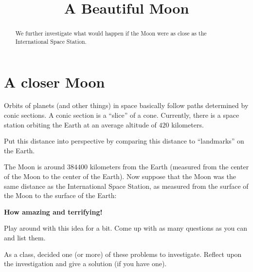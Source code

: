 \documentclass[handout,nonumbers,space]{ximera}
\title{A Beautiful Moon}
\begin{document}
\begin{abstract}
We further investigate what would happen if the Moon were as close as the
International Space Station.
\end{abstract}
\maketitle

\section*{A closer Moon}

Orbits of planets (and other things) in space basically follow paths
determined by conic sections. A conic section is a ``slice'' of a
cone. Currently, there is a space station orbiting the Earth at an average
altitude of $420$ kilometers.

\begin{problem}
Put this distance into perspective by comparing this distance to
``landmarks'' on the Earth.
\begin{freeResponse}
\end{freeResponse}
\end{problem}

The Moon is around $384400$ kilometers from the Earth (measured from
the center of the Moon to the center of the Earth). Now suppose that
the Moon was the same distance as the International Space Station, as
measured from the surface of the Moon to the surface of the Earth:

\begin{center}
\textbf{How amazing and terrifying!}
\end{center}

\break

\begin{problem}
Play around with this idea for a bit. Come up with as many questions
as you can and list them.
\begin{freeResponse}
\end{freeResponse}
\end{problem}

\begin{problem}
As a class, decided one (or more) of these problems to
investigate. Reflect upon the investigation and give a solution (if
you have one).
\begin{freeResponse}
\end{freeResponse}
\end{problem}
\end{document}
